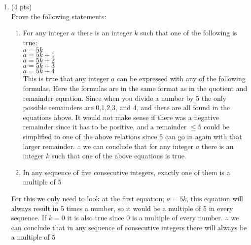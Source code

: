 \documentclass[12pt]{article}
\begin{document}
\begin{enumerate}
\begin{enumerate}
\end{enumerate}


\item (4 pts) \\
Prove the following statements:
\begin{enumerate}
	\item    For any integer \(a\) there is an integer \(k\) such that one of the following is true:\\
	\(a=5k\)
	\leavevmode\\\relax
	\(a=5k+1\)
	\leavevmode\\\relax
	\(a=5k+2\)
	\leavevmode\\\relax
	\(a=5k+3\)
	\leavevmode\\\relax
	\(a=5k+4\)
    \\This is true that any integer $a$ can be expressed with any of the following formulas. Here the formulas are in the same format as in the quotient and remainder equation. Since when you divide a number by 5 the only possible remainders are 0,1,2,3, and 4, and there are all found in the equations above. It would not make sense if there was a negative remainder since it has to be positive, and a remainder $\leq 5$ could be simplified to one of the above relations since 5 can go in again with that larger remainder. $\therefore$ we can conclude that for any integer $a$ there is an integer $k$ such that one of the above equations is true.
	
\item         In any sequence of five consecutive integers, exactly one of them is a multiple of 5
\end{enumerate}
For this we only need to look at the first equation; $a = 5k$, this equation will always result in 5 times a number, so it would be a multiple of 5 in every sequence. If $k=0$ it is also true since 0 is a multiple of every number. $\therefore$ we can conclude that in any sequence of consecutive integers there will always be a multiple of 5





\end{enumerate}
\end{document}
